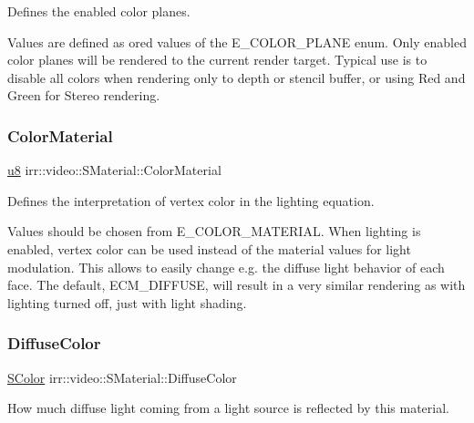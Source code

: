 Defines the enabled color planes. 

Values are defined as or\textquotesingle{}ed values of the E\+\_\+\+C\+O\+L\+O\+R\+\_\+\+P\+L\+A\+NE enum. Only enabled color planes will be rendered to the current render target. Typical use is to disable all colors when rendering only to depth or stencil buffer, or using Red and Green for Stereo rendering. \mbox{\label{classirr_1_1video_1_1SMaterial_a127d0d7a428cb9e5450f2e448b7652ae}} 
\subsubsection{\texorpdfstring{Color\+Material}{ColorMaterial}}
{\footnotesize\ttfamily \hyperlink{namespaceirr_a646874f69af8ff87fc10201b0254a761}{u8} irr\+::video\+::\+S\+Material\+::\+Color\+Material}



Defines the interpretation of vertex color in the lighting equation. 

Values should be chosen from E\+\_\+\+C\+O\+L\+O\+R\+\_\+\+M\+A\+T\+E\+R\+I\+AL. When lighting is enabled, vertex color can be used instead of the material values for light modulation. This allows to easily change e.\+g. the diffuse light behavior of each face. The default, E\+C\+M\+\_\+\+D\+I\+F\+F\+U\+SE, will result in a very similar rendering as with lighting turned off, just with light shading. \mbox{\label{classirr_1_1video_1_1SMaterial_ac4e1aaf4751f7267eaf255496cc058df}} 
\subsubsection{\texorpdfstring{Diffuse\+Color}{DiffuseColor}}
{\footnotesize\ttfamily \hyperlink{classirr_1_1video_1_1SColor}{S\+Color} irr\+::video\+::\+S\+Material\+::\+Diffuse\+Color}



How much diffuse light coming from a light source is reflected by this material. 

